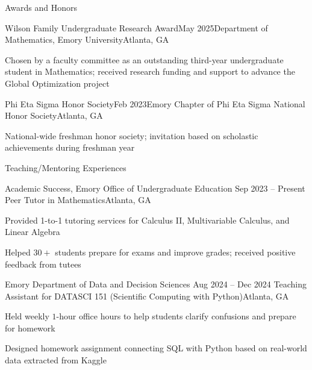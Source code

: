 \documentclass[10pt, letterpaper]{resume} %
\begin{document}
\begin{rSection}{Awards and Honors}
\begin{rSubsection}{Wilson Family Undergraduate Research Award}{May 2025}{Department of Mathematics, Emory University}{Atlanta, GA}
	\item Chosen by a faculty committee as an outstanding third-year undergraduate student in Mathematics; received research funding and support to advance the Global Optimization project
\end{rSubsection}

\begin{rSubsection}{Phi Eta Sigma Honor Society}{Feb 2023}{Emory Chapter of Phi Eta Sigma National Honor Society}{Atlanta, GA}
	\item National-wide freshman honor society; invitation based on scholastic achievements during freshman year
\end{rSubsection}
\end{rSection} 

\begin{rSection}{Teaching/Mentoring Experiences}
\begin{rSubsection}
	{Academic Success, Emory Office of Undergraduate Education}
	{Sep 2023 -- Present}
	{Peer Tutor in Mathematics}{Atlanta, GA}
	
	\item Provided 1-to-1 tutoring services for Calculus II, Multivariable Calculus, and Linear Algebra 
	\item Helped $30+$ students prepare for exams and improve grades; received positive feedback from tutees
\end{rSubsection}

\begin{rSubsection}
	{Emory Department of Data and Decision Sciences}
	{Aug 2024 -- Dec 2024}
	{Teaching Assistant for DATASCI 151 (Scientific Computing with Python)}{Atlanta, GA}
	
	\item Held weekly $1$-hour office hours to help students clarify confusions and prepare for homework 
	\item Designed homework assignment connecting SQL with Python based on real-world data extracted from Kaggle 
\end{rSubsection}
\end{rSection}
\end{document}
